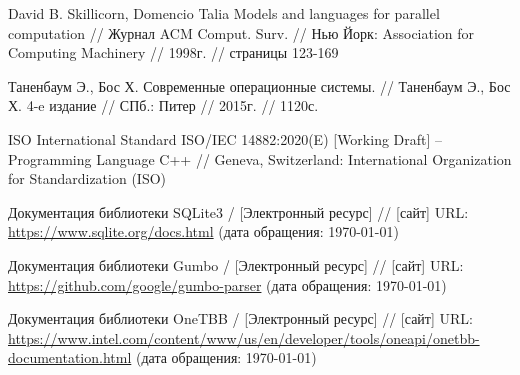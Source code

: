 \begin{thebibliography}{}
   David B. Skillicorn, Domencio Talia Models and languages for parallel computation // Журнал ACM Comput. Surv. // Нью Йорк: Association for Computing Machinery // 1998г. // страницы 123-169
  
   Таненбаум Э., Бос Х. Современные операционные системы. // Таненбаум Э., Бос Х. 4-e издание // СПб.: Питер // 2015г. // 1120с.
  
   ISO International Standard ISO/IEC 14882:2020(E) [Working Draft] – Programming Language C++ // Geneva, Switzerland: International Organization for Standardization (ISO)

   Документация библиотеки SQLite3 / [Электронный ресурс] // [сайт] URL: \url{https://www.sqlite.org/docs.html} (дата обращения: \today)

   Документация библиотеки Gumbo / [Электронный ресурс] // [сайт] URL: \url{https://github.com/google/gumbo-parser} (дата обращения: \today) 

   Документация библиотеки OneTBB / [Электронный ресурс] // [сайт] URL: \url{https://www.intel.com/content/www/us/en/developer/tools/oneapi/onetbb-documentation.html} (дата обращения: \today)
\end{thebibliography}